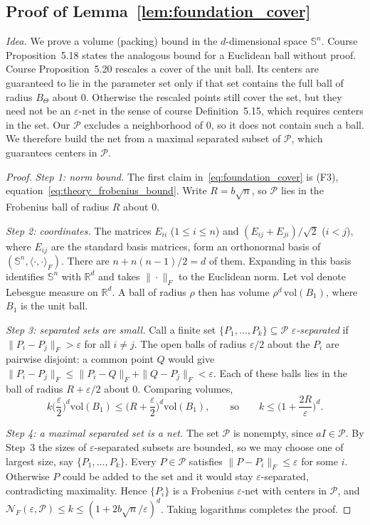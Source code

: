 \subsection{Proof of Lemma~\ref{lem:foundation_cover}}
\label{subsec:proof_cover}

\emph{Idea.} We prove a volume (packing) bound in the $d$-dimensional
space $\mathbb S^n$. Course Proposition~5.18 states the analogous bound for
a Euclidean ball without proof. Course Proposition~5.20 rescales a cover of
the unit ball. Its centers are guaranteed to lie in the parameter set only
if that set contains the full ball of radius $B_\Theta$ about $0$.
Otherwise the rescaled points still cover the set, but they need not be an
$\varepsilon$-net in the sense of course Definition~5.15, which requires
centers in the set. Our $\mathcal P$ excludes a neighborhood of $0$, so it
does not contain such a ball. We therefore build the net from a maximal
separated subset of $\mathcal P$, which guarantees centers in $\mathcal P$.

\begin{proof}
\emph{Step 1: norm bound.} The first claim
in~\eqref{eq:foundation_cover} is (F3),
equation~\eqref{eq:theory_frobenius_bound}. Write $R=b\sqrt n$, so
$\mathcal P$ lies in the Frobenius ball of radius $R$ about $0$.

\emph{Step 2: coordinates.} The matrices $E_{ii}$ ($1\le i\le n$) and
$(E_{ij}+E_{ji})/\sqrt2$ ($i<j$), where $E_{ij}$ are the standard basis
matrices, form an orthonormal basis of $(\mathbb S^n,\langle\cdot,\cdot
\rangle_F)$. There are $n+n(n-1)/2=d$ of them. Expanding in this basis
identifies $\mathbb S^n$ with $\mathbb R^d$ and takes $\|\cdot\|_F$ to the
Euclidean norm. Let $\mathrm{vol}$ denote Lebesgue measure on $\mathbb R^d$.
A ball of radius $\rho$ then has volume $\rho^d\,\mathrm{vol}(B_1)$, where
$B_1$ is the unit ball.

\emph{Step 3: separated sets are small.} Call a finite set
$\{P_1,\ldots,P_k\}\subseteq\mathcal P$ \emph{$\varepsilon$-separated} if
$\|P_i-P_j\|_F>\varepsilon$ for all $i\ne j$. The open balls of radius
$\varepsilon/2$ about the $P_i$ are pairwise disjoint: a common point $Q$
would give $\|P_i-P_j\|_F\le\|P_i-Q\|_F+\|Q-P_j\|_F<\varepsilon$. Each of
these balls lies in the ball of radius $R+\varepsilon/2$ about $0$.
Comparing volumes,
\[
 k\Big(\frac\varepsilon2\Big)^d\mathrm{vol}(B_1)
 \le\Big(R+\frac\varepsilon2\Big)^d\mathrm{vol}(B_1),
 \qquad\text{so}\qquad
 k\le\Big(1+\frac{2R}{\varepsilon}\Big)^d .
\]

\emph{Step 4: a maximal separated set is a net.} The set $\mathcal P$ is
nonempty, since $aI\in\mathcal P$. By Step~3 the sizes of
$\varepsilon$-separated subsets are bounded, so we may choose one of largest
size, say $\{P_1,\ldots,P_k\}$. Every $P\in\mathcal P$ satisfies
$\|P-P_i\|_F\le\varepsilon$ for some $i$. Otherwise $P$ could be added to
the set and it would stay $\varepsilon$-separated, contradicting
maximality. Hence $\{P_i\}$ is a Frobenius $\varepsilon$-net with centers in
$\mathcal P$, and $\mathcal N_F(\varepsilon,\mathcal P)\le k\le
(1+2b\sqrt n/\varepsilon)^d$. Taking logarithms completes the proof.
\end{proof}

